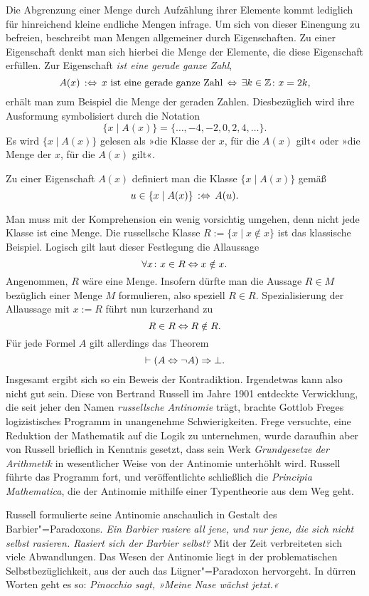 Die Abgrenzung einer Menge durch Aufzählung ihrer Elemente kommt
lediglich für hinreichend kleine endliche Mengen infrage. Um sich von
dieser Einengung zu befreien, beschreibt man Mengen allgemeiner durch
Eigenschaften. Zu einer Eigenschaft denkt man sich hierbei die Menge der
Elemente, die diese Eigenschaft erfüllen. Zur Eigenschaft
\emph{ist eine gerade ganze Zahl},
\[A(x)\,:\Leftrightarrow\,\text{$x$ ist eine gerade ganze Zahl}\,
\Leftrightarrow\,\exists k\in\mathbb Z\colon x=2k,\]
erhält man zum Beispiel die Menge der geraden Zahlen. Diesbezüglich wird
ihre Ausformung symbolisiert durch die Notation
\[\{x\mid A(x)\} = \{\ldots,-4,-2,0,2,4,\ldots\}.\]
Es wird $\{x\mid A(x)\}$ gelesen als »die Klasse der $x$, für die
$A(x)$ gilt« oder »die Menge der $x$, für die $A(x)$ gilt«.
\begin{Definition}[Komprehension]%
\label{def:Komprehension}\newlinefirst
Zu einer Eigenschaft $A(x)$ definiert man die Klasse
$\{x\mid A(x)\}$ gemäß
\[u\in\{x\mid A(x)\}\,:\Leftrightarrow\, A(u).\]
\end{Definition}
Man muss mit der Komprehension ein wenig vorsichtig umgehen, denn nicht
jede Klasse ist eine Menge. Die russellsche Klasse $R := \{x\mid x\notin x\}$
ist das klassische Beispiel. Logisch gilt laut dieser Festlegung die
Allaussage
\[\forall x\colon x\in R\Leftrightarrow x\notin x.\]
Angenommen, $R$ wäre eine Menge. Insofern dürfte man die Aussage
$R\in M$ bezüglich einer Menge $M$ formulieren, also speziell $R\in R$.
Spezialisierung der Allaussage mit $x:=R$ führt nun kurzerhand zu
\[R\in R\Leftrightarrow R\notin R.\]
Für jede Formel $A$ gilt allerdings das Theorem
\[\vdash (A\Leftrightarrow\lnot A)\Rightarrow\bot.\]
Insgesamt ergibt sich so ein Beweis der Kontradiktion. Irgendetwas kann
also nicht gut sein. Diese von Bertrand Russell im Jahre 1901 entdeckte
Verwicklung, die seit jeher den Namen \emph{russellsche Antinomie}%
 trägt, brachte Gottlob Freges
logizistisches Programm in unangenehme Schwierigkeiten. Frege versuchte,
eine Reduktion der Mathematik auf die Logik zu unternehmen, wurde
daraufhin aber von Russell brieflich in Kenntnis gesetzt, dass sein
Werk \emph{Grundgesetze der Arithmetik} in wesentlicher Weise von der
Antinomie unterhöhlt wird. Russell führte das Programm fort, und
veröffentlichte schließlich die \emph{Principia Mathematica}, die der
Antinomie mithilfe einer Typentheorie aus dem Weg geht.
\cite{Coquand-Type-Theory}

Russell formulierte seine Antinomie anschaulich in Gestalt des
Barbier"=Paradoxons. \emph{Ein Barbier rasiere all jene, und nur jene, die
sich nicht selbst rasieren. Rasiert sich der Barbier selbst?}
Mit der Zeit verbreiteten sich viele Abwandlungen. Das Wesen der
Antinomie liegt in der problematischen Selbstbezüglichkeit, aus der
auch das Lügner"=Paradoxon hervorgeht. In dürren Worten geht es so:
\emph{Pinocchio sagt, »Meine Nase wächst jetzt.«}

